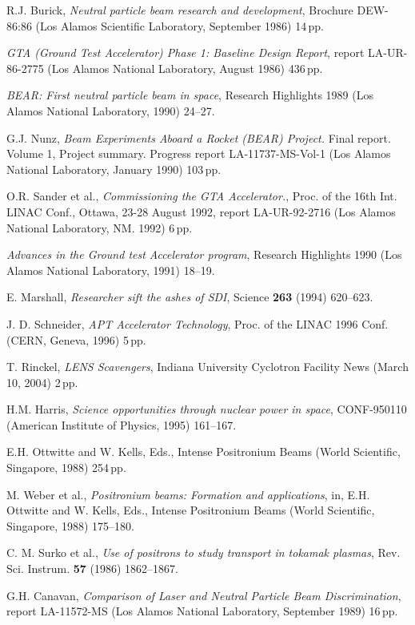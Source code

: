 \documentclass [12pt,a4paper,     ]{report} %
\begin{document}
\begin{enumerate}
 R.J. Burick, \emph{Neutral particle beam research and development}, Brochure DEW-86:86 (Los Alamos Scientific Laboratory, September 1986) 14\,pp.

 \emph{GTA (Ground Test Accelerator) Phase 1: Baseline Design Report}, report LA-UR-86-2775 (Los Alamos National Laboratory, August 1986) 436\,pp.

 \emph{BEAR: First neutral particle beam in space}, Research Highlights 1989 (Los Alamos National Laboratory, 1990) 24--27.

 G.J. Nunz, \emph{Beam Experiments Aboard a Rocket (BEAR) Project.} Final report. Volume 1, Project summary. Progress report LA-11737-MS-Vol-1 (Los Alamos National Laboratory, January 1990) 103\,pp.

  O.R. Sander et al., \emph{Commissioning the GTA Accelerator.}, Proc. of the 16th Int. LINAC Conf., Ottawa, 23-28 August 1992, report LA-UR-92-2716 (Los Alamos National Laboratory, NM. 1992) 6\,pp.

 \emph{Advances in the Ground test Accelerator program}, Research Highlights 1990 (Los Alamos National Laboratory, 1991) 18--19.

 E. Marshall, \emph{Researcher sift the ashes of SDI}, Science {\bf 263} (1994) 620--623.

 J. D. Schneider, \emph{APT Accelerator Technology}, Proc. of the LINAC 1996 Conf. (CERN, Geneva, 1996) 5\,pp.

 T. Rinckel, \emph{LENS Scavengers}, Indiana University Cyclotron Facility News (March 10, 2004) 2\,pp.

 H.M. Harris, \emph{Science opportunities through nuclear power in space}, CONF-950110 (American Institute of Physics, 1995) 161--167.

 E.H. Ottwitte and W. Kells, Eds., Intense Positronium Beams (World Scientific, Singapore, 1988) 254\,pp.

 M. Weber et al., \emph{Positronium beams: Formation and applications}, in, E.H. Ottwitte and W. Kells, Eds., Intense Positronium Beams (World Scientific, Singapore, 1988) 175--180.

 C. M. Surko et al., \emph{Use of positrons to study transport in tokamak plasmas}, Rev. Sci. Instrum. {\bf 57} (1986) 1862--1867.

 G.H. Canavan, \emph{Comparison of Laser and Neutral Particle Beam Discrimination}, report LA-11572-MS (Los Alamos National Laboratory, September 1989) 16\,pp.


\end{enumerate}
\end{document}
